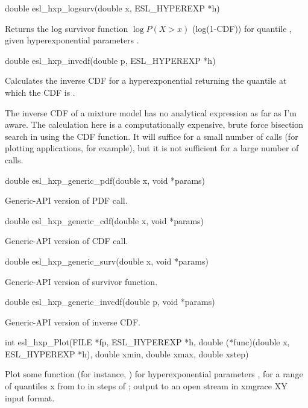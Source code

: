 \begin{sreapi}
\hypertarget{func:esl_hxp_logsurv()}
{\item[double esl\_hxp\_logsurv(double x, ESL\_HYPEREXP *h)]}

Returns the log survivor function $\log P(X > x)$ (log(1-CDF))
for quantile , given hyperexponential parameters .


\hypertarget{func:esl_hxp_invcdf()}
{\item[double esl\_hxp\_invcdf(double p, ESL\_HYPEREXP *h)]}

Calculates the inverse CDF for a hyperexponential 
returning the quantile  at which the CDF is .

The inverse CDF of a mixture model has no
analytical expression as far as I'm aware. The calculation
here is a computationally expensive, brute force bisection
search in  using the CDF function. It will suffice for
a small number of calls (for plotting applications, for example),
but it is not sufficient for a large number of calls.


\hypertarget{func:esl_hxp_generic_pdf()}
{\item[double esl\_hxp\_generic\_pdf(double x, void *params)]}

Generic-API version of PDF call.


\hypertarget{func:esl_hxp_generic_cdf()}
{\item[double esl\_hxp\_generic\_cdf(double x, void *params)]}

Generic-API version of CDF call.


\hypertarget{func:esl_hxp_generic_surv()}
{\item[double esl\_hxp\_generic\_surv(double x, void *params)]}

Generic-API version of survivor function.


\hypertarget{func:esl_hxp_generic_invcdf()}
{\item[double esl\_hxp\_generic\_invcdf(double p, void *params)]}

Generic-API version of inverse CDF.


\hypertarget{func:esl_hxp_Plot()}
{\item[int esl\_hxp\_Plot(FILE *fp, ESL\_HYPEREXP *h,
	     double (*func)(double x, ESL\_HYPEREXP *h), 
	     double xmin, double xmax, double xstep)]}

Plot some function  (for instance, )
for hyperexponential parameters , for a range of
quantiles x from  to  in steps of ;
output to an open stream  in xmgrace XY input format.


\end{sreapi}
